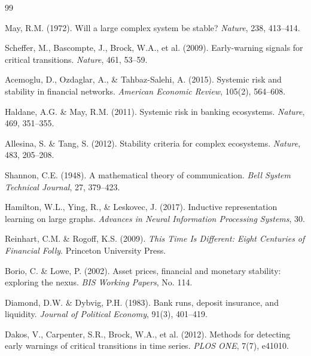 \documentclass[12pt,a4paper]{article}
\begin{document}
\begin{thebibliography}{99}

May, R.M. (1972).
Will a large complex system be stable?
\textit{Nature}, 238, 413--414.

Scheffer, M., Bascompte, J., Brock, W.A., et al. (2009).
Early-warning signals for critical transitions.
\textit{Nature}, 461, 53--59.

Acemoglu, D., Ozdaglar, A., \& Tahbaz-Salehi, A. (2015).
Systemic risk and stability in financial networks.
\textit{American Economic Review}, 105(2), 564--608.

Haldane, A.G. \& May, R.M. (2011).
Systemic risk in banking ecosystems.
\textit{Nature}, 469, 351--355.

Allesina, S. \& Tang, S. (2012).
Stability criteria for complex ecosystems.
\textit{Nature}, 483, 205--208.

Shannon, C.E. (1948).
A mathematical theory of communication.
\textit{Bell System Technical Journal}, 27, 379--423.

Hamilton, W.L., Ying, R., \& Leskovec, J. (2017).
Inductive representation learning on large graphs.
\textit{Advances in Neural Information Processing Systems}, 30.

Reinhart, C.M. \& Rogoff, K.S. (2009).
\textit{This Time Is Different: Eight Centuries of Financial Folly}.
Princeton University Press.

Borio, C. \& Lowe, P. (2002).
Asset prices, financial and monetary stability: exploring the nexus.
\textit{BIS Working Papers}, No. 114.

Diamond, D.W. \& Dybvig, P.H. (1983).
Bank runs, deposit insurance, and liquidity.
\textit{Journal of Political Economy}, 91(3), 401--419.

Dakos, V., Carpenter, S.R., Brock, W.A., et al. (2012).
Methods for detecting early warnings of critical transitions in time series.
\textit{PLOS ONE}, 7(7), e41010.

\end{thebibliography}
\end{document}
